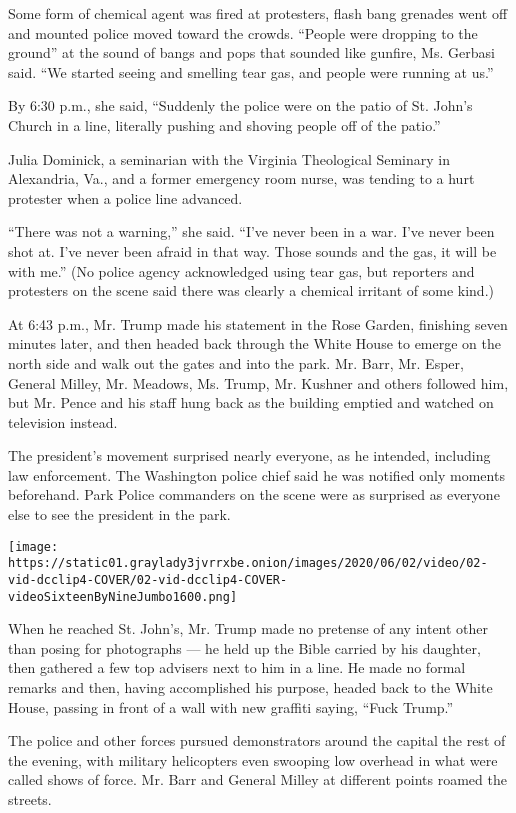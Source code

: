 Some form of chemical agent was fired at protesters, flash bang grenades
went off and mounted police moved toward the crowds. ``People were
dropping to the ground'' at the sound of bangs and pops that sounded
like gunfire, Ms. Gerbasi said. ``We started seeing and smelling tear
gas, and people were running at us.''

By 6:30 p.m., she said, ``Suddenly the police were on the patio of St.
John's Church in a line, literally pushing and shoving people off of the
patio.''

Julia Dominick, a seminarian with the Virginia Theological Seminary in
Alexandria, Va., and a former emergency room nurse, was tending to a
hurt protester when a police line advanced.

``There was not a warning,'' she said. ``I've never been in a war. I've
never been shot at. I've never been afraid in that way. Those sounds and
the gas, it will be with me.'' (No police agency acknowledged using tear
gas, but reporters and protesters on the scene said there was clearly a
chemical irritant of some kind.)

At 6:43 p.m., Mr. Trump made his statement in the Rose Garden, finishing
seven minutes later, and then headed back through the White House to
emerge on the north side and walk out the gates and into the park. Mr.
Barr, Mr. Esper, General Milley, Mr. Meadows, Ms. Trump, Mr. Kushner and
others followed him, but Mr. Pence and his staff hung back as the
building emptied and watched on television instead.

The president's movement surprised nearly everyone, as he intended,
including law enforcement. The Washington police chief said he was
notified only moments beforehand. Park Police commanders on the scene
were as surprised as everyone else to see the president in the park.

\texttt{[image: https://static01.graylady3jvrrxbe.onion/images/2020/06/02/video/02-vid-dcclip4-COVER/02-vid-dcclip4-COVER-videoSixteenByNineJumbo1600.png]}

When he reached St. John's, Mr. Trump made no pretense of any intent
other than posing for photographs --- he held up the Bible carried by
his daughter, then gathered a few top advisers next to him in a line. He
made no formal remarks and then, having accomplished his purpose, headed
back to the White House, passing in front of a wall with new graffiti
saying, ``Fuck Trump.''

The police and other forces pursued demonstrators around the capital the
rest of the evening, with military helicopters even swooping low
overhead in what were called shows of force. Mr. Barr and General Milley
at different points roamed the streets.


